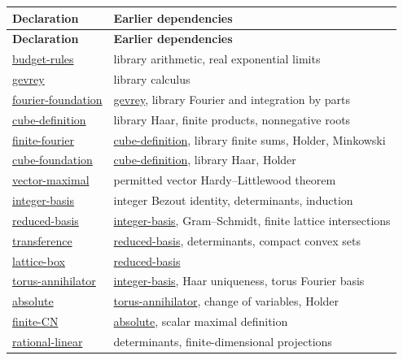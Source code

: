 \documentclass[11pt]{article}
\theoremstyle{definition}
\numberwithin{equation}{section}
\begin{document}
\begin{longtable}{@{}p{}p{}@{}}
\textbf{Declaration} & \textbf{Earlier dependencies}\\\hline
\endfirsthead
\textbf{Declaration} & \textbf{Earlier dependencies}\\\hline
\endhead
\hyperlink{bp:budget-rules}{budget-rules} & library arithmetic, real exponential limits\\[3pt]
\hyperlink{bp:gevrey}{gevrey} & library calculus\\[3pt]
\hyperlink{bp:fourier-foundation}{fourier-foundation} & \hyperlink{bp:gevrey}{gevrey}, library Fourier and integration by parts\\[3pt]
\hyperlink{bp:cube-definition}{cube-definition} & library Haar, finite products, nonnegative roots\\[3pt]
\hyperlink{bp:finite-fourier}{finite-fourier} & \hyperlink{bp:cube-definition}{cube-definition}, library finite sums, Holder, Minkowski\\[3pt]
\hyperlink{bp:cube-foundation}{cube-foundation} & \hyperlink{bp:cube-definition}{cube-definition}, library Haar, Holder\\[3pt]
\hyperlink{bp:vector-maximal}{vector-maximal} & permitted vector Hardy--Littlewood theorem\\[3pt]
\hyperlink{bp:integer-basis}{integer-basis} & integer Bezout identity, determinants, induction\\[3pt]
\hyperlink{bp:reduced-basis}{reduced-basis} & \hyperlink{bp:integer-basis}{integer-basis}, Gram--Schmidt, finite lattice intersections\\[3pt]
\hyperlink{bp:transference}{transference} & \hyperlink{bp:reduced-basis}{reduced-basis}, determinants, compact convex sets\\[3pt]
\hyperlink{bp:lattice-box}{lattice-box} & \hyperlink{bp:reduced-basis}{reduced-basis}\\[3pt]
\hyperlink{bp:torus-annihilator}{torus-annihilator} & \hyperlink{bp:integer-basis}{integer-basis}, Haar uniqueness, torus Fourier basis\\[3pt]
\hyperlink{bp:absolute}{absolute} & \hyperlink{bp:torus-annihilator}{torus-annihilator}, change of variables, Holder\\[3pt]
\hyperlink{bp:finite-CN}{finite-CN} & \hyperlink{bp:absolute}{absolute}, scalar maximal definition\\[3pt]
\hyperlink{bp:rational-linear}{rational-linear} & determinants, finite-dimensional projections\\[3pt]

\end{longtable}
\end{document}
